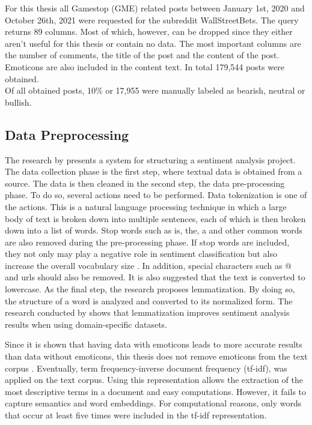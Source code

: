 \documentclass[11pt, a4paper]{article}
\begin{document}
For this thesis all Gamestop (GME) related posts between January 1st, 2020 and October 26th, 2021 were requested for the subreddit WallStreetBets. 
The query returns 89 columns. Most of which, however, can be dropped since they either aren’t useful for this thesis or contain no data. 
The most important columns are the number of comments, the title of the post and the content of the post. 
Emoticons are also included in the content text. In total 179,544 posts were obtained.\\
Of all obtained posts, 10\% or 17,955 were manually labeled as bearish, neutral or bullish.

\subsection{Data Preprocessing} \label{subs:datapreprocessing}
The research by \cite{jemai2021SentimentAnalysis} presents a system for structuring a sentiment analysis project. 
The data collection phase is the first step, where textual data is obtained from a source. 
The data is then cleaned in the second step, the data pre-processing phase. To do so, several actions need to be performed. 
Data tokenization is one of the actions. This is a natural language processing technique in which a large body of text is broken down into multiple sentences, 
each of which is then broken down into a list of words. Stop words such as is, the, a and other common words are also removed during the 
pre-processing phase. If stop words are included, they not only may play a negative role in sentiment classification but also increase the overall vocabulary size \citep{zhao2017comparisontextprocess}.
In addition, special characters such as @ and urls should also be removed. 
It is also suggested that the text is converted to lowercase. As the final step, the research proposes lemmatization. By doing so,
the structure of a word is analyzed and converted to its normalized form. The research conducted by \cite{camachocollados2018role} 
shows that lemmatization improves sentiment analysis results when using domain-specific datasets.

Since it is shown that having data with emoticons leads to more accurate results than data without emoticons,
this thesis does not remove emoticons from the text corpus \citep{parveen2016sentimentanalysistwitter}.
Eventually, term frequency-inverse document frequency (tf-idf), was applied on the text corpus. 
Using this representation allows the extraction of the most descriptive terms in a document and easy computations. 
However, it fails to capture semantics and word embeddings. For computational reasons, only words that occur at least five times were included in the tf-idf representation. %
\end{document}

